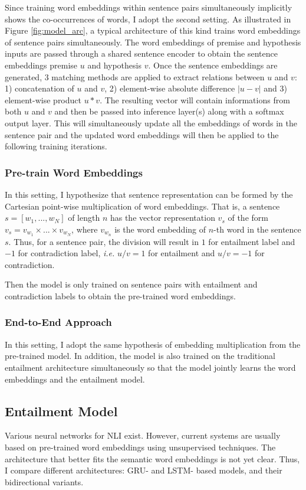 \documentclass{article}
\newcommand{\ie}{\emph{i.e. }}
\begin{document}
Since training word embeddings within sentence pairs simultaneously implicitly shows the co-occurrences of words, I adopt the second setting. As illustrated in Figure \ref{fig:model_arc}, a typical architecture of this kind trains word embeddings of sentence pairs simultaneously. The word embeddings of premise and hypothesis inputs are passed through a shared sentence encoder to obtain the sentence embeddings premise $u$ and hypothesis $v$. Once the sentence embeddings are generated, 3 matching methods are applied to extract relations between $u$ and $v$: 1) concatenation of $u$ and $v$, 2) element-wise absolute difference $|u - v|$ and 3) element-wise product $u*v$. The resulting vector will contain informations from both $u$ and $v$ and then be passed into inference layer(s) along with a softmax output layer. This will simultaneously update all the embeddings of words in the sentence pair and the updated word embeddings will then be applied to the following training iterations.

\subsubsection{Pre-train Word Embeddings}
In this setting, I hypothesize that sentence representation can be formed by the Cartesian point-wise multiplication of word embeddings. That is, a sentence $s = [w_1, ..., w_N]$ of length $n$ has the vector representation $v_s$ of the form $v_s = v_{w_1} \times ... \times v_{w_N}$, where $v_{w_n}$ is the word embedding of $n$-th word in the sentence $s$. Thus, for a sentence pair, the division will result in $1$ for entailment label and $-1$ for contradiction label, \ie $u / v = 1$ for entailment and $u / v = -1$ for contradiction.

Then the model is only trained on sentence pairs with entailment and contradiction labels to obtain the pre-trained word embeddings.

\subsubsection{End-to-End Approach}
In this setting, I adopt the same hypothesis of embedding multiplication from the pre-trained model. In addition, the model is also trained on the traditional entailment architecture simultaneously so that the model jointly learns the word embeddings and the entailment model.

\subsection{Entailment Model}
Various neural networks for NLI exist. However, current systems are usually based on pre-trained word embeddings using unsupervised techniques. The architecture that better fits the semantic word embeddings is not yet clear. Thus, I compare different architectures: GRU- and LSTM- based models, and their bidirectional variants.
\end{document}
